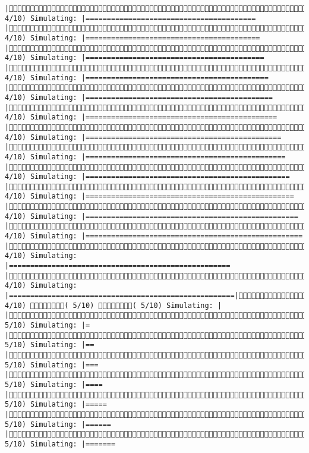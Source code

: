 \documentclass[]{article}
\begin{document}
\begin{verbatim}
|( 4/10) Simulating: |========================================             |( 4/10) Simulating: |=========================================            |( 4/10) Simulating: |==========================================           |( 4/10) Simulating: |===========================================          |( 4/10) Simulating: |============================================         |( 4/10) Simulating: |=============================================        |( 4/10) Simulating: |==============================================       |( 4/10) Simulating: |===============================================      |( 4/10) Simulating: |================================================     |( 4/10) Simulating: |=================================================    |( 4/10) Simulating: |==================================================   |( 4/10) Simulating: |===================================================  |( 4/10) Simulating: |==================================================== |( 4/10) Simulating: |=====================================================|( 4/10) ( 5/10) ( 5/10) Simulating: |                                                     |( 5/10) Simulating: |=                                                    |( 5/10) Simulating: |==                                                   |( 5/10) Simulating: |===                                                  |( 5/10) Simulating: |====                                                 |( 5/10) Simulating: |=====                                                |( 5/10) Simulating: |======                                               |( 5/10) Simulating: |=======                                 
\end{verbatim}
\end{document}
